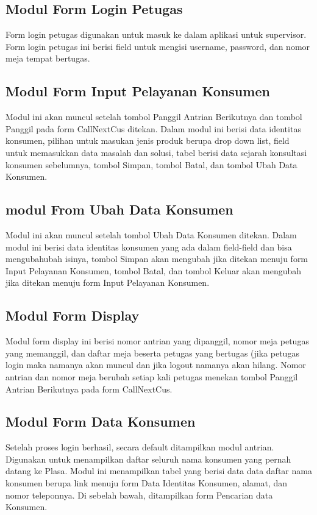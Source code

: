 \documentclass[12pt,a4paper]{article}
\begin{document}
\subsection{Modul Form Login Petugas}
Form login petugas digunakan untuk masuk ke dalam aplikasi untuk supervisor. Form login petugas ini berisi
field untuk mengisi username, password, dan nomor meja tempat bertugas. 
\subsection{Modul Form Input Pelayanan Konsumen}
Modul ini akan muncul setelah tombol Panggil Antrian Berikutnya dan tombol Panggil pada form CallNextCus ditekan. 
Dalam modul ini berisi data identitas konsumen, pilihan untuk masukan jenis produk berupa drop down list,
field untuk memasukkan data masalah dan solusi, tabel berisi data sejarah konsultasi konsumen sebelumnya, tombol Simpan, tombol
Batal, dan tombol Ubah Data Konsumen. 
\subsection{modul From Ubah Data Konsumen}
Modul ini akan muncul setelah tombol Ubah Data Konsumen ditekan. Dalam modul ini berisi data identitas konsumen yang ada dalam field-field dan bisa mengubahubah isinya, tombol Simpan akan mengubah jika ditekan menuju form Input Pelayanan Konsumen, tombol Batal, dan tombol Keluar akan mengubah jika ditekan menuju form Input Pelayanan Konsumen.
\subsection{Modul Form Display}
Modul form display ini berisi nomor antrian yang dipanggil, nomor meja petugas yang memanggil, dan daftar meja beserta petugas yang bertugas (jika petugas login maka namanya akan muncul dan jika logout namanya akan hilang. Nomor antrian dan nomor meja berubah setiap kali petugas menekan tombol Panggil Antrian Berikutnya pada form CallNextCus.
\subsection{Modul Form Data Konsumen}
Setelah proses login berhasil, secara default ditampilkan modul antrian. Digunakan untuk menampilkan daftar seluruh nama konsumen yang pernah datang ke Plasa. Modul ini menampilkan tabel yang berisi data data daftar nama konsumen berupa link menuju form Data Identitas Konsumen, alamat, dan nomor teleponnya. Di sebelah bawah, ditampilkan form  Pencarian data Konsumen.
\end{document}
